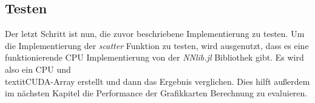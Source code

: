 \subsection{Testen}

Der letzt Schritt ist nun, die zuvor beschriebene Implementierung zu testen.
Um die Implementierung der \textit{scatter} Funktion zu testen, wird ausgenutzt,
dass es eine funktionierende CPU Implementierung von der \textit{NNlib.jl} Bibliothek gibt.
Es wird also ein CPU und \\textit{CUDA}-Array erstellt und dann das Ergebnis verglichen.
Dies hilft außerdem im nächsten Kapitel die Performance der Grafikkarten Berechnung zu evaluieren.